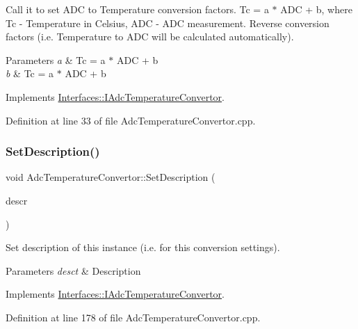 Call it to set A\+DC to Temperature conversion factors. Tc = a $\ast$ A\+DC + b, where Tc -\/ Temperature in Celsius, A\+DC -\/ A\+DC measurement. Reverse conversion factors (i.\+e. Temperature to A\+DC will be calculated automatically). 


\begin{DoxyParams}{Parameters}
{\em a} & Tc = a $\ast$ A\+DC + b \\
\hline
{\em b} & Tc = a $\ast$ A\+DC + b \\
\hline
\end{DoxyParams}


Implements \hyperlink{class_interfaces_1_1_i_adc_temperature_convertor_a3e4c9204b3593bc434a041c7a69c430f}{Interfaces\+::\+I\+Adc\+Temperature\+Convertor}.



Definition at line 33 of file Adc\+Temperature\+Convertor.\+cpp.

\mbox{\label{class_adc_temperature_convertor_a56103443d7da4769339ddb685a0a8df0}} 
\subsubsection{\texorpdfstring{Set\+Description()}{SetDescription()}}
{\footnotesize\ttfamily void Adc\+Temperature\+Convertor\+::\+Set\+Description (\begin{DoxyParamCaption}\item[{Q\+String}]{descr }\end{DoxyParamCaption})\hspace{0.3cm}{\ttfamily [virtual]}}



Set description of this instance (i.\+e. for this conversion settings). 


\begin{DoxyParams}{Parameters}
{\em desct} & Description \\
\hline
\end{DoxyParams}


Implements \hyperlink{class_interfaces_1_1_i_adc_temperature_convertor_a65bbef2300e21c495d95305921ddb74b}{Interfaces\+::\+I\+Adc\+Temperature\+Convertor}.



Definition at line 178 of file Adc\+Temperature\+Convertor.\+cpp.

